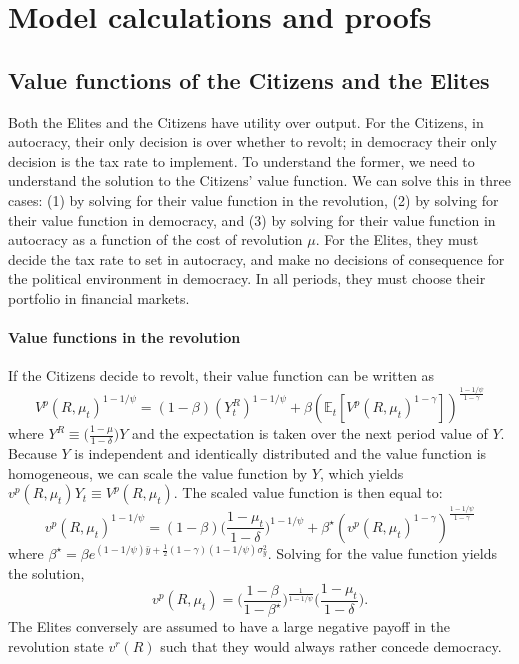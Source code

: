 
\section{Model calculations and proofs}

\subsection{Value functions of the Citizens and the Elites}\label{section:bellman_app}

Both the Elites and the Citizens have \citeauthor{Epstein1989} utility over output. For the Citizens, in autocracy, their only decision is over whether to revolt; in democracy their only decision is the tax rate to implement. To understand the former, we need to understand the solution to the Citizens' value function. We can solve this in three cases: (1) by solving for their value function in the revolution, (2) by solving for their value function in democracy, and (3) by solving for their value function in autocracy as a function of the cost of revolution $\mu$. For the Elites, they must decide the tax rate to set in autocracy, and make no decisions of consequence for the political environment in democracy. In all periods, they must choose their portfolio in financial markets.

\paragraph{Value functions in the revolution}
If the Citizens decide to revolt, their value function can be written as
\begin{equation*}
V^{p}(R,\mu_{t})^{1-1/\psi}=(1-\beta)(Y_{t}^{R})^{1-1/\psi}+\beta\left(\mathbb{E}_{t}\left[V^{p}(R,\mu_{t})^{1-\gamma}\right]\right)^{\frac{1-1/\psi}{1-\gamma}}
\end{equation*}
where $Y^R \equiv \big(\frac{1-\mu}{1-\delta}\big) Y$ and the expectation is taken over the next period value of $Y$. Because $Y$ is independent and identically distributed and the value function is homogeneous, we can scale the value function by $Y$, which yields $v^{p}(R,\mu_t)Y_t \equiv V^{p}(R,\mu_t)$. The scaled value function is then equal to:
\begin{equation*}
v^{p}(R,\mu_{t})^{1-1/\psi}=(1-\beta)\bigg(\frac{1-\mu_t}{1-\delta}\bigg)^{1-1/\psi}+\beta^{\star}\left(v^{p}(R,\mu_{t})^{1-\gamma}\right)^{\frac{1-1/\psi}{1-\gamma}}
\end{equation*}
where $\beta^{\star}=\beta e^{(1-1/\psi)\bar{y}+\frac{1}{2}(1-\gamma)(1-1/\psi)\sigma_{y}^{2}}$. Solving for the value function yields the solution,
\begin{equation*}
v^{p}(R,\mu_{t})=\bigg(\frac{1-\beta}{1-\beta^{\star}}\bigg)^{\frac{1}{1-1/\psi}}\bigg(\frac{1-\mu_t}{1-\delta}\bigg).
\end{equation*}
The Elites conversely are assumed to have a large negative payoff in the revolution state $v^r(R)$ such that they would always rather concede democracy.

